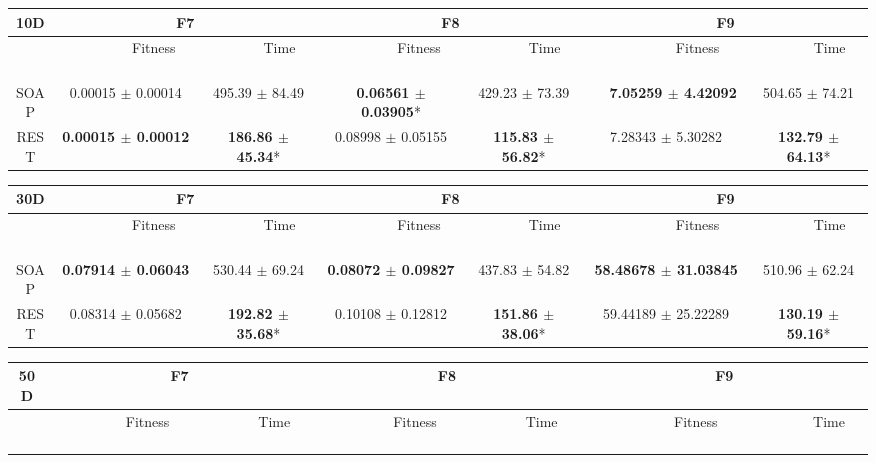 \documentclass[final,1p,times]{elsarticle}
\begin{document}
\begin{table}[!ht]

\scriptsize{
\begin{tabular}{|c|c|c||c|c||c|c|}
\hline 
\textbf{10D}& \multicolumn{2}{|c||}{F7} & \multicolumn{2}{|c||}{F8}    & \multicolumn{2}{|c|}{F9}    \\
\hline
       &\ \ \ \ \ \ \ \ \ \ Fitness\ \ \ \ \ \ \ \ \ \ &\ \ \ \ \ \ \ \ Time\ \ \ \ \ \ \ \ &\ \ \ \ \ \ \ \ \ \ Fitness\ \ \ \ \ \ \ \ \ \ &\ \ \ \ \ \ \ \ Time\ \ \ \ \ \ \ \ &\ \ \ \ \ \ \ \ \ \ \ \ Fitness\ \ \ \ \ \ \ \ \ \ \ \ &\ \ \ \ \ \ \ \ Time\ \ \ \ \ \ \ \  \\
\cline{2-7}
 SOAP  & 0.00015 $\pm$ 0.00014 &  495.39 $\pm$ 84.49 & \textbf{0.06561 $\pm$ 0.03905}*  & 429.23 $\pm$ 73.39 &  \ \ \textbf{7.05259 $\pm$ 4.42092} \ \ \ \ & 504.65 $\pm$ 74.21  \\
 REST  & \textbf{0.00015 $\pm$ 0.00012} \ \ &  \textbf{186.86 $\pm$ 45.34}* &  0.08998 $\pm$ 0.05155  & \textbf{115.83 $\pm$ 56.82}* &  7.28343 $\pm$ 5.30282 & \textbf{132.79 $\pm$ 64.13}*  \\
\hline
\end{tabular}
}
\scriptsize{
\begin{tabular}{|c|c|c||c|c||c|c|}
\hline 
\textbf{30D}& \multicolumn{2}{|c||}{F7} & \multicolumn{2}{|c||}{F8}    & \multicolumn{2}{|c|}{F9}    \\
\hline
       &\ \ \ \ \ \ \ \ \ \ Fitness\ \ \ \ \ \ \ \ \ \ &\ \ \ \ \ \ \ \ Time\ \ \ \ \ \ \ \ &\ \ \ \ \ \ \ \ \ \ Fitness\ \ \ \ \ \ \ \ \ \ &\ \ \ \ \ \ \ \ Time\ \ \ \ \ \ \ \ &\ \ \ \ \ \ \ \ \ \ \ \ Fitness\ \ \ \ \ \ \ \ \ \ \ \ &\ \ \ \ \ \ \ \ Time\ \ \ \ \ \ \ \  \\
\cline{2-7}
 SOAP  & \textbf{0.07914 $\pm$ 0.06043} \ \ &  530.44 $\pm$ 69.24 &  \textbf{0.08072 $\pm$ 0.09827} \ \  & 437.83 $\pm$ 54.82 &  \textbf{58.48678 $\pm$ 31.03845} \ \ & 510.96 $\pm$ 62.24  \\
 REST  & 0.08314 $\pm$ 0.05682 &  \textbf{192.82 $\pm$ 35.68}* &  0.10108 $\pm$ 0.12812  & \textbf{151.86 $\pm$ 38.06}* &  59.44189 $\pm$ 25.22289 & \textbf{130.19 $\pm$ 59.16}*  \\
\hline
\end{tabular}
}
\scriptsize{
\begin{tabular}{|c|c|c||c|c||c|c|}
\hline 
\textbf{50D}& \multicolumn{2}{|c||}{F7} & \multicolumn{2}{|c||}{F8}    & \multicolumn{2}{|c|}{F9}    \\
\hline
       &\ \ \ \ \ \ \ \ \ \ Fitness\ \ \ \ \ \ \ \ \ \ &\ \ \ \ \ \ \ \ Time\ \ \ \ \ \ \ \ &\ \ \ \ \ \ \ \ \ \ Fitness\ \ \ \ \ \ \ \ \ \ &\ \ \ \ \ \ \ \ Time\ \ \ \ \ \ \ \ &\ \ \ \ \ \ \ \ \ \ \ \ Fitness\ \ \ \ \ \ \ \ \ \ \ \ &\ \ \ \ \ \ \ \ Time\ \ \ \ \ \ \ \  \\

\end{tabular}}
\end{table}
\end{document}
